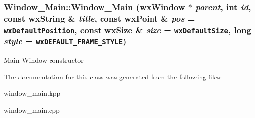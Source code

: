\subsubsection{\setlength{\rightskip}{0pt plus 5cm}Window\_\-Main::Window\_\-Main (wx\-Window $\ast$ {\em parent}, int {\em id}, const wx\-String \& {\em title}, const wx\-Point \& {\em pos} = {\tt wxDefaultPosition}, const wx\-Size \& {\em size} = {\tt wxDefaultSize}, long {\em style} = {\tt wxDEFAULT\_\-FRAME\_\-STYLE})}\label{classWindow__Main_a0}


Main Window constructor 

The documentation for this class was generated from the following files:\begin{CompactItemize}
\item 
window\_\-main.hpp\item 
window\_\-main.cpp\end{CompactItemize}
